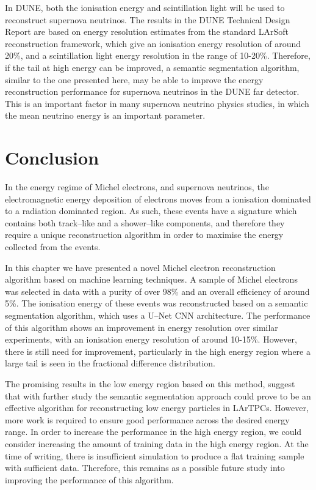 In DUNE, both the ionisation energy and scintillation light will be used to
reconstruct supernova neutrinos. The results in the DUNE Technical Design
Report are based on energy resolution estimates from the standard
LArSoft reconstruction framework, which give an ionisation energy resolution of
around 20\%, and a scintillation light energy resolution in the range of
10-20\%\cite{Abi:2020evt}. Therefore, if the tail at high energy can be 
improved, a semantic segmentation algorithm, similar to the one presented 
here, may be able to improve the energy reconstruction performance for 
supernova neutrinos in the DUNE far detector. This is an important factor in
many supernova neutrino physics studies, in which the mean neutrino energy is an
important parameter\cite{Abi:2020evt}.

\section{Conclusion} \label{ME_EU}

In the energy regime of Michel electrons, and supernova neutrinos, the
electromagnetic energy deposition of electrons moves from a ionisation dominated
to a radiation dominated region. As such, these events have a signature which
contains both track--like and a shower--like components, and therefore they 
require a unique reconstruction algorithm in order to maximise the energy 
collected from the events. 

In this chapter we have presented a novel Michel electron reconstruction
algorithm based on machine learning techniques. A sample of Michel electrons was
selected in \protodune{} data with a purity of over 98\% and an overall
efficiency of around 5\%. The ionisation energy of these events was
reconstructed based on a semantic segmentation algorithm, which uses a U--Net
CNN architecture. The performance of this algorithm shows an improvement in
energy resolution over similar experiments, with an ionisation energy resolution
of around 10-15\%. However, there is still need for improvement, particularly 
in the high energy region where a large tail is seen in the fractional 
difference distribution. 

The promising results in the low energy region based on this method, suggest
that with further study the semantic segmentation approach could prove to be an
effective algorithm for reconstructing low energy particles in LArTPCs. However,
more work is required to ensure good performance across the desired energy
range. In order to increase the performance in the high energy region, we could
consider increasing the amount of training data in the high energy region. At
the time of writing, there is insufficient \protodune{} simulation to produce 
a flat training sample with sufficient data. Therefore, this remains as a 
possible future study into improving the performance of this algorithm.
